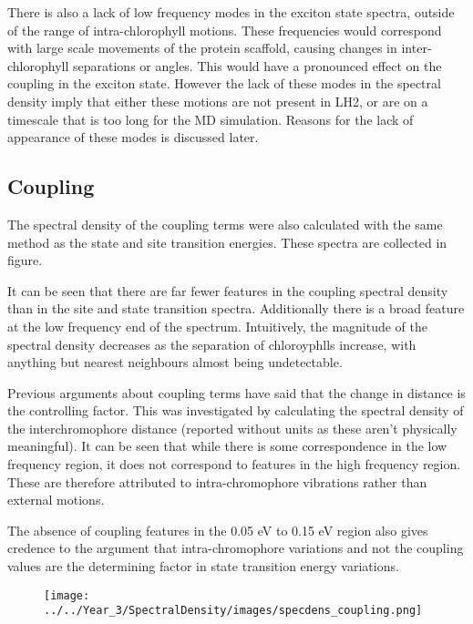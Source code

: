There is also a lack of low frequency modes in the exciton state spectra, outside
of the range of intra-chlorophyll motions. These frequencies would correspond with
large scale movements of the protein scaffold, causing changes in inter-chlorophyll
separations or angles. This would have a pronounced effect on the coupling in the
exciton state. However the lack of these modes in the spectral density imply that
either these motions are not present in LH2, or are on a timescale that is too long
for the MD simulation. Reasons for the lack of appearance of these modes is discussed
later.

\afterpartskip
\subsection{Coupling}
\label{subcsec:coupling}

The spectral density of the coupling terms were also calculated with the same method
as the state and site transition energies. These spectra are collected in figure.

It can be seen that there are far fewer features in the coupling spectral density
than in the site and state transition spectra. Additionally there is a broad feature
at the low frequency end of the spectrum. Intuitively, the magnitude of the spectral 
density decreases as the separation of chloroyphlls increase, with anything but
nearest neighbours almost being undetectable.

Previous arguments about coupling terms have said that the change in distance is
the controlling factor. This was investigated by calculating the spectral density
of the interchromophore distance (reported without units as these aren't physically
meaningful). It can be seen that while there is some correspondence in the low frequency
region, it does not correspond to features in the high frequency region. These are
therefore attributed to intra-chromophore vibrations rather than external motions.

The absence of coupling features in the 0.05 eV to 0.15 eV region also gives credence
to the argument that intra-chromophore variations and not the coupling values are
the determining factor in state transition energy variations.

\begin{figure}
    \centering
    \texttt{[image: ../../Year\_3/SpectralDensity/images/specdens\_coupling.png]}
\end{figure}

